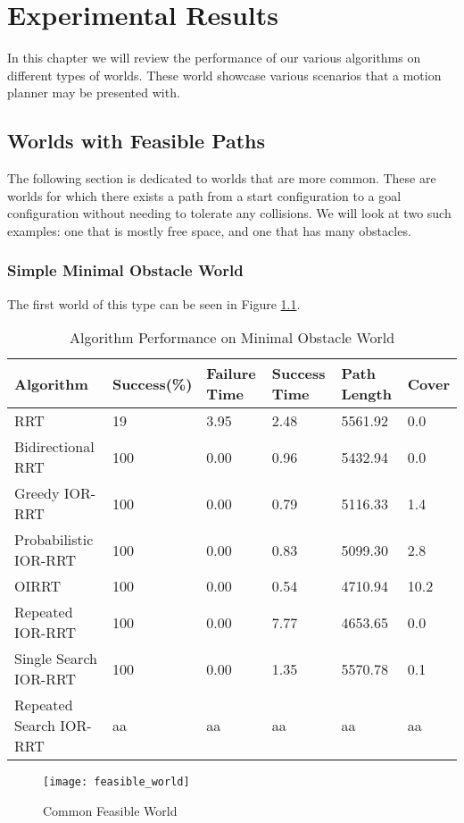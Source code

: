 \chapter{Experimental Results}
In this chapter we will review the performance of our various algorithms on different types of worlds. These world showcase various scenarios that a motion planner may be presented with. 
\section{Worlds with Feasible Paths}
The following section is dedicated to worlds that are more common. These are worlds for which there exists a path from a start configuration to a goal configuration without needing to tolerate any collisions. We will look at two such examples: one that is mostly free space, and one that has many obstacles.

\subsection{Simple Minimal Obstacle World}
The first world of this type can be seen in Figure \ref{fig:feasible_world}.

\begin{table}
\begin{tabular}{@{}llllll@{}}
\toprule
Algorithm & Success(\%)  & Failure Time  & Success Time  & Path Length & Cover\\ 
\midrule
RRT & 19 & 3.95 & 2.48 & 5561.92 & 0.0 \\ 
Bidirectional RRT & 100 & 0.00 & 0.96 & 5432.94 & 0.0 \\
Greedy IOR-RRT & 100 & 0.00 & 0.79 & 5116.33 & 1.4 \\
Probabilistic IOR-RRT & 100 & 0.00 & 0.83 & 5099.30 & 2.8 \\
OIRRT & 100 & 0.00 & 0.54 & 4710.94 & 10.2 \\
Repeated IOR-RRT & 100 & 0.00 & 7.77 & 4653.65 & 0.0 \\
Single Search IOR-RRT & 100 & 0.00 & 1.35 & 5570.78 & 0.1 \\
Repeated Search IOR-RRT & aa & aa & aa & aa & aa \\
\bottomrule
\end{tabular}
\caption{Algorithm Performance on Minimal Obstacle World}
\label{tab:feasible_world}
\end{table}

\begin{figure}[h]
    \centering
    \texttt{[image: feasible\_world]}
    \caption{Common Feasible World}
    \label{fig:feasible_world}
\end{figure}

